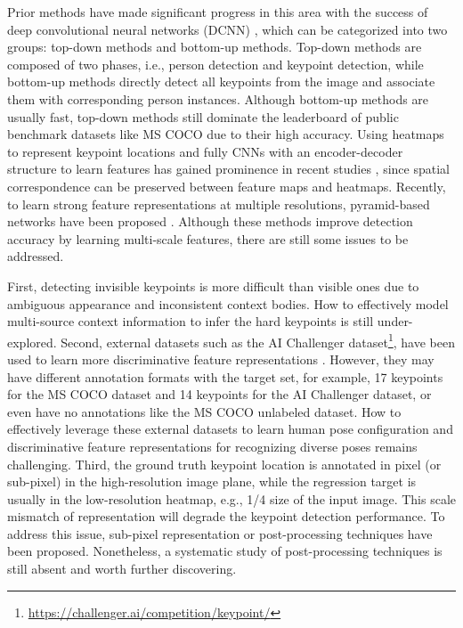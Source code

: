 \documentclass[twocolumn]{svjour3}          \smartqed  \usepackage{natbib}
\begin{document}
Prior methods have made significant progress in this area with the success of deep convolutional neural networks (DCNN) \citep{toshev2014deeppose}, which can be categorized into two groups: top-down methods and bottom-up methods. Top-down methods are composed of two phases, i.e., person detection and keypoint detection, while bottom-up methods directly detect all keypoints from the image and associate them with corresponding person instances. Although bottom-up methods \citep{cao2017realtime} are usually fast, top-down methods still dominate the leaderboard of public benchmark datasets like MS COCO due to their high accuracy. Using heatmaps to represent keypoint locations and fully CNNs with an encoder-decoder structure to learn features has gained prominence in recent studies \citep{newell2016stacked,huang2017coarse}, since spatial correspondence can be preserved between feature maps and heatmaps. Recently, to learn strong feature representations at multiple resolutions, pyramid-based networks have been proposed \citep{yang2017learning,chen2018cascaded}. Although these methods improve detection accuracy by learning multi-scale features, there are still some issues to be addressed.

First, detecting invisible keypoints is more difficult than visible ones due to ambiguous appearance and inconsistent context bodies. How to effectively model multi-source context information to infer the hard keypoints is still under-explored. Second, external datasets such as the AI Challenger dataset\footnote{\url{https://challenger.ai/competition/keypoint/}}, have been used to learn more discriminative feature representations \citep{xiao2018simple,sun2019deep}. However, they may have different annotation formats with the target set, for example, 17 keypoints for the MS COCO dataset and 14 keypoints for the AI Challenger dataset, or even have no annotations like the MS COCO unlabeled dataset. How to effectively leverage these external datasets to learn human pose configuration and discriminative feature representations for recognizing diverse poses remains challenging. Third, the ground truth keypoint location is annotated in pixel (or sub-pixel) in the high-resolution image plane, while the regression target is usually in the low-resolution heatmap, e.g., 1/4 size of the input image. This scale mismatch of representation will degrade the keypoint detection performance. To address this issue, sub-pixel representation or post-processing techniques \citep{chen2018cascaded,zhang2020distribution} have been proposed. Nonetheless, a systematic study of post-processing techniques is still absent and worth further discovering.
\end{document}
